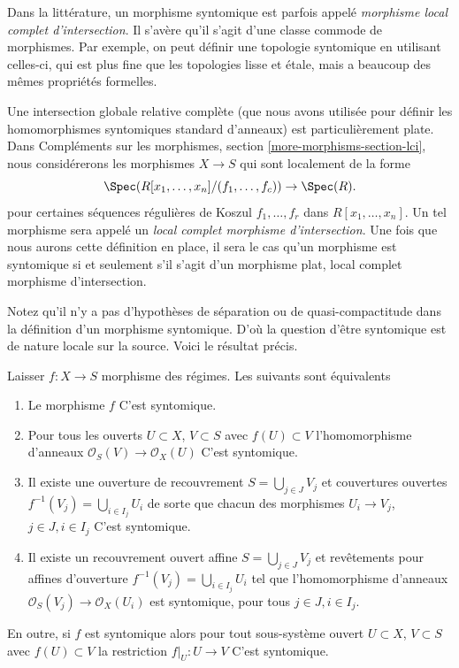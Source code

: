 \noindent
Dans la littérature, un morphisme syntomique est parfois appelé {\it morphisme local complet d'intersection}. Il s'avère qu'il s'agit d'une classe commode de morphismes. Par exemple, on peut définir une topologie syntomique en utilisant celles-ci, qui est plus fine que les topologies lisse et \'etale, mais a beaucoup des mêmes propriétés formelles.

\medskip\noindent
Une intersection globale relative complète (que nous avons utilisée pour définir les homomorphismes syntomiques standard d'anneaux) est particulièrement plate. Dans Compléments sur les morphismes, section \ref{more-morphisms-section-lci}, nous considérerons les morphismes $X \to S$ qui sont localement de la forme $$
\Spec(R[x_1, \ldots, x_n]/(f_1, \ldots, f_c)) \to \Spec(R).
$$ pour certaines séquences régulières de Koszul $f_1, \ldots, f_r$ dans $R[x_1, \ldots, x_n]$. Un tel morphisme sera appelé un {\it local complet morphisme d'intersection}. Une fois que nous aurons cette définition en place, il sera le cas qu'un morphisme est syntomique si et seulement s'il s'agit d'un morphisme plat, local complet morphisme d'intersection.

\medskip\noindent
Notez qu'il n'y a pas d'hypothèses de séparation ou de quasi-compactitude dans la définition d'un morphisme syntomique. D'où la question d'être syntomique est de nature locale sur la source. Voici le résultat précis.

\begin{lemma}

\label{lemma-syntomic-characterize}

Laisser $f : X \to S$ morphisme des régimes. Les suivants sont équivalents

\begin{enumerate}

\item Le morphisme $f$ C'est syntomique.
\item Pour tous les ouverts $U \subset X$, $V \subset S$
avec $f(U) \subset V$ l'homomorphisme d'anneaux
$\mathcal{O}_S(V) \to \mathcal{O}_X(U)$ C'est syntomique.
\item Il existe une ouverture de recouvrement $S = \bigcup_{j \in J} V_j$
et couvertures ouvertes $f^{-1}(V_j) = \bigcup_{i \in I_j} U_i$ de sorte que chacun des morphismes $U_i \to V_j$, $j\in J, i\in I_j$
C'est syntomique.
\item Il existe un recouvrement ouvert affine $S = \bigcup_{j \in J} V_j$
et revêtements pour affines d'ouverture $f^{-1}(V_j) = \bigcup_{i \in I_j} U_i$ tel que l'homomorphisme d'anneaux $\mathcal{O}_S(V_j) \to \mathcal{O}_X(U_i)$ est syntomique, pour tous $j\in J, i\in I_j$.

\end{enumerate}

En outre, si $f$ est syntomique alors pour tout sous-système ouvert $U \subset X$, $V \subset S$ avec $f(U) \subset V$
la restriction $f|_U : U \to V$ C'est syntomique.

\end{lemma}

